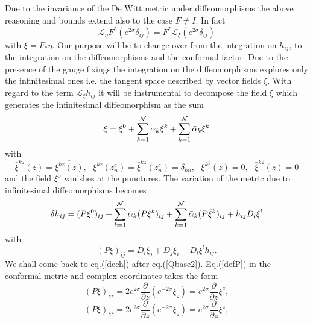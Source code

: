 \documentclass[a4paper,12pt]{article}
\begin{document}
Due to the invariance of the De Witt metric under diffeomorphisms the above
reasoning and bounds extend also to the case $F\neq I$. In fact
\begin{equation}
\mathcal{L}_{\eta}
F^*(e^{2\sigma}\delta_{ij})=
F^*\mathcal{L}_{\xi}(e^{2\sigma}\delta_{ij})
\end{equation}
with $\xi = F_*\eta$.
Our purpose will be to change over from the integration on
$h_{ij}$, to the integration on the diffeomorphisms and the conformal
factor. Due to the presence of the gauge fixings the integration on the
diffeomorphisms explores only the infinitesimal ones i.e. the
tangent space described by vector fields $\xi$. 
With regard to the term
$ \mathcal{L}_{\xi} h_{ij}$ it will be instrumental to decompose the
field $\xi$ which generates the infinitesimal diffeomorphism as the sum
\begin{equation}\label{xidec}
\xi = \xi^{0} + \sum_{k=1}^{\cal N} \alpha_k \xi^{k}
+\sum_{k=1}^{\cal N} \bar \alpha_k \bar \xi^{k}
\end{equation}
with 
\begin{equation}\label{xipunct}
\bar \xi^{k\bar z}(z) = \overline {\xi^{kz}(z)},~~~
\xi^{kz}(z^c_n)=\bar\xi^{k\bar z}(z^c_n)=\delta_{kn},~~~
\xi^{k\bar z}(z)=0,~~~
\bar \xi^{kz}(z)=0
\end{equation}
and the field $\xi^{0}$ vanishes at the
punctures. The variation of the metric due to infinitesimal
diffeomorphisms becomes
\begin{equation}\label{dech}
\delta h_{ij} = (P\xi^{0})_{ij} + \sum_{k=1}^{\cal N} \alpha_k
(P\xi^{k})_{ij} + 
\sum_{k=1}^{\cal N} \bar \alpha_k (P\bar \xi^{k})_{ij} +
h_{ij}D_l\xi^l 
\end{equation}
with
\begin{equation}\label{defP}
(P\xi)_{ij} = D_i\xi_j+D_j\xi_i -D_l\xi^l h_{ij}.
\end{equation}
We shall come back to eq.(\ref{dech}) after eq.(\ref{Qbase2}).
Eq.(\ref{defP}) in the conformal metric and complex coordinates takes the
form \cite{alvarez}
\begin{equation}\label{defPcz}
(P\xi)_{zz} = 2
e^{2\sigma}\frac{\partial}{\partial 
z} (e^{-2\sigma}\xi_{z}) = e^{2\sigma}\frac{\partial}{\partial
z}\xi^{\bar z},
\end{equation}
\begin{equation}\label{defPcbz}
(P\xi)_{\bar z\bar z} = 2
e^{2\sigma}\frac{\partial}{\partial 
\bar z} (e^{-2\sigma}\xi_{\bar z}) = e^{2\sigma}\frac{\partial}{\partial
\bar z}\xi^{z},
\end{equation}
\end{document}
